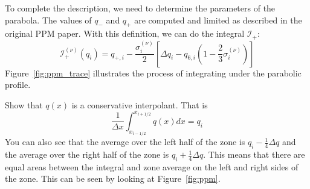 To complete the description, we need to determine the parameters of
the parabola.  The values of $q_-$ and $q_+$ are computed and limited
as described in the original PPM paper.  With this definition, we can
do the integral $\mathcal{I}_+$:
\begin{equation}
\mathcal{I}_+^{(\nu)}(q_i) = q_{+,i} - \frac{\sigma_i^{(\nu)}}{2} 
   \left [ \Delta q_i - q_{6,i} \left ( 1 - \frac{2}{3} \sigma_i^{(\nu)} \right ) \right ]
\end{equation}
Figure~\ref{fig:ppm_trace} illustrates the process of integrating under
the parabolic profile.


\begin{exercise}
{Show that $q(x)$ is a conservative interpolant.  That is
\begin{equation}
\frac{1}{\Delta x} \int_{x_{i-1/2}}^{x_{i+1/2}} q(x) dx = q_i
\end{equation}
You can also see that the average over the left half of the zone is
$q_i -\frac{1}{4}\Delta q$ and the average over the right half of the
zone is $q_i + \frac{1}{4}\Delta q$.  This means that there are equal
areas between the integral and zone average on the left and right
sides of the zone.  This can be seen by looking at
Figure~\ref{fig:ppm}.  }
\end{exercise}

